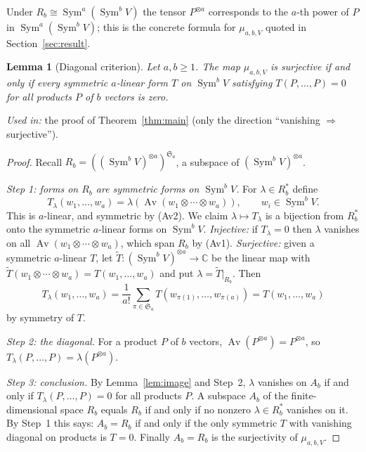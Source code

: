 \documentclass[11pt]{article}
\newtheorem{lemma}[theorem]{Lemma}
\theoremstyle{remark}
\DeclareMathOperator{\Sym}{Sym}
\DeclareMathOperator{\Av}{Av}
\newcommand{\C}{\mathbb C}
\newcommand{\Sa}{\mathfrak S_a}
\begin{document}
Under $R_b\cong\Sym^a(\Sym^bV)$ the tensor $P^{\otimes a}$ corresponds to the
$a$-th power of $P$ in $\Sym^a(\Sym^bV)$; this is the concrete formula for
$\mu_{a,b,V}$ quoted in Section~\ref{sec:result}.

\begin{lemma}[Diagonal criterion]\label{lem:criterion}
Let $a,b\ge1$. The map $\mu_{a,b,V}$ is surjective if and only if every
symmetric $a$-linear form $T$ on $\Sym^b V$ satisfying $T(P,\ldots,P)=0$ for
all products $P$ of $b$ vectors is zero.
\end{lemma}

\noindent\emph{Used in:} the proof of Theorem~\ref{thm:main} (only the
direction ``vanishing $\Rightarrow$ surjective'').

\begin{proof}
Recall $R_b=((\Sym^bV)^{\otimes a})^{\Sa}$, a subspace of
$(\Sym^bV)^{\otimes a}$.

\emph{Step 1: forms on $R_b$ are symmetric forms on $\Sym^bV$.} For
$\lambda\in R_b^*$ define
\[
 T_\lambda(w_1,\ldots,w_a)
 =\lambda\!\left(\Av(w_1\otimes\cdots\otimes w_a)\right),
 \qquad w_i\in\Sym^bV .
\]
This is $a$-linear, and symmetric by (Av2). We claim
$\lambda\mapsto T_\lambda$ is a bijection from $R_b^*$ onto the symmetric
$a$-linear forms on $\Sym^bV$.
\emph{Injective:} if $T_\lambda=0$ then $\lambda$ vanishes on all
$\Av(w_1\otimes\cdots\otimes w_a)$, which span $R_b$ by (Av1).
\emph{Surjective:} given a symmetric $a$-linear $T$, let
$\widetilde T\colon(\Sym^bV)^{\otimes a}\to\C$ be the linear map with
$\widetilde T(w_1\otimes\cdots\otimes w_a)=T(w_1,\dots,w_a)$ and put
$\lambda=\widetilde T|_{R_b}$. Then
\[
 T_\lambda(w_1,\dots,w_a)
 =\frac1{a!}\sum_{\pi\in\Sa}T(w_{\pi(1)},\dots,w_{\pi(a)})
 =T(w_1,\dots,w_a)
\]
by symmetry of $T$.

\emph{Step 2: the diagonal.} For a product $P$ of $b$ vectors,
$\Av(P^{\otimes a})=P^{\otimes a}$, so
$T_\lambda(P,\ldots,P)=\lambda(P^{\otimes a})$.

\emph{Step 3: conclusion.} By Lemma~\ref{lem:image} and Step~2, $\lambda$
vanishes on $A_b$ if and only if $T_\lambda(P,\dots,P)=0$ for all products
$P$. A subspace $A_b$ of the finite-dimensional space $R_b$ equals $R_b$ if
and only if no nonzero $\lambda\in R_b^*$ vanishes on it. By Step~1 this
says: $A_b=R_b$ if and only if the only symmetric $T$ with vanishing
diagonal on products is $T=0$. Finally $A_b=R_b$ is the surjectivity of
$\mu_{a,b,V}$.
\end{proof}
\end{document}
